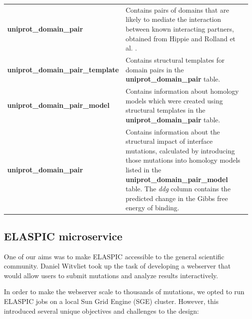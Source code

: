\begin{table}[!tb]
\begin{tabular}{l | p{10cm}}
	\textbf{uniprot\_domain\_pair} & Contains pairs of domains that are likely to mediate the interaction between known interacting partners, obtained from Hippie \cite{schaefer_hippie:_2012} and Rolland et al. \cite{rolland_proteome-scale_2014}. \\
	\textbf{uniprot\_domain\_pair\_template} & Contains structural templates for domain pairs in the \textbf{uniprot\_domain\_pair} table. \\
	\textbf{uniprot\_domain\_pair\_model} & Contains information about homology models which were created using structural templates in the \textbf{uniprot\_domain\_pair} table. \\
	\textbf{uniprot\_domain\_pair} & Contains information about the structural impact of interface mutations, calculated by introducing those mutations into homology models listed in the \textbf{uniprot\_domain\_pair\_model} table. The \textit{ddg} column contains the predicted change in the Gibbs free energy of binding. \\
	\bottomrule
\end{tabular}
\end{table}



\subsection{ELASPIC microservice}

One of our aims was to make ELASPIC accessible to the general scientific community. Daniel Witvliet took up the task of developing a webserver that would allow users to submit mutations and analyze results interactively.

In order to make the webserver scale to thousands of mutations, we opted to run ELASPIC jobs on a local Sun Grid Engine (SGE) cluster. However, this introduced several unique objectives and challenges to the design:

